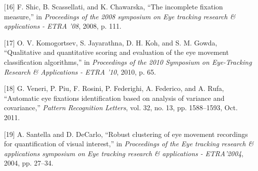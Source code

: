 \documentclass[brazil,]{report}
\begin{document}
{[}16{]} F. Shic, B. Scassellati, and K. Chawarska, ``The incomplete
fixation measure,'' in \emph{Proceedings of the 2008 symposium on Eye
tracking research \& applications - ETRA '08}, 2008, p. 111.

{[}17{]} O. V. Komogortsev, S. Jayarathna, D. H. Koh, and S. M. Gowda,
``Qualitative and quantitative scoring and evaluation of the eye
movement classification algorithms,'' in \emph{Proceedings of the 2010
Symposium on Eye-Tracking Research \& Applications - ETRA '10}, 2010, p.
65.

{[}18{]} G. Veneri, P. Piu, F. Rosini, P. Federighi, A. Federico, and A.
Rufa, ``Automatic eye fixations identification based on analysis of
variance and covariance,'' \emph{Pattern Recognition Letters}, vol. 32,
no. 13, pp. 1588--1593, Oct. 2011.

{[}19{]} A. Santella and D. DeCarlo, ``Robust clustering of eye movement
recordings for quantification of visual interest,'' in \emph{Proceedings
of the Eye tracking research \& applications symposium on Eye tracking
research \& applications - ETRA'2004}, 2004, pp. 27--34.
\end{document}

